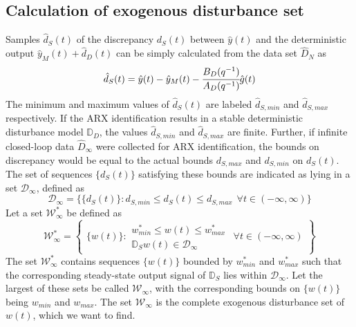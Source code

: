 \documentclass[letterpaper, 10 pt, conference]{ieeeconf}  %
\begin{document}
	\subsection{Calculation of exogenous disturbance set}
	\label{Noise}
	Samples $\hat{d}_S(t)$ of the discrepancy $d_S(t)$ between $\hat{y}(t)$ and the deterministic output $\hat{y}_M(t)+\hat{d}_D(t)$ can be simply calculated from the data set $\hat{D}_{N}$ as 
	\begin{equation*}
	\hat{d}_S(t) = \hat{y}(t)-\hat{y}_M(t)-\cfrac{B_D(q^{-1})}{A_D(q^{-1})} \hat{g}(t) 
	\end{equation*}
	The minimum and maximum values of $\hat{d}_S(t)$ are labeled $\hat{d}_{S,min}$ and $\hat{d}_{S,max}$ respectively. If the ARX identification results in a stable deterministic disturbance model $\mathbb{D}_D$, the values $\hat{d}_{S,min}$ and $\hat{d}_{S,max}$ are finite. Further, if infinite closed-loop data $\hat{D}_{\infty}$ were collected for ARX identification, the bounds on discrepancy would be equal to the actual bounds $d_{S,max}$ and $d_{S,min}$ on $d_S(t)$. The set of sequences $\{d_S(t)\}$ satisfying these bounds are indicated as lying in a set $\mathcal{D}_{\infty}$, defined as 
	\begin{equation*}
	\mathcal{D}_{\infty} = \{\{d_S(t)\}: d_{S,min} \leq d_S(t) \leq d_{S,max} \hspace{5pt} \forall t \in (-\infty,\infty) \}
	\end{equation*}
	 Let a set $\mathcal{W}^{*}_{\infty}$ be defined as
	\begin{equation*}
	\hspace{0pt}
	\mathcal{W}^*_{\infty} = \begin{Bmatrix} \{w(t)\}: 
	\begin{matrix}
	w^*_{min}\leq w(t)\leq w^*_{max} \\ 
	\mathbb{D}_S w(t) \in \mathcal{D}_{\infty}
	\end{matrix} \hspace{5pt}
	\forall t \in (-\infty,\infty) 
	\end{Bmatrix}
	\end{equation*}  
	The set $\mathcal{W}^*_{\infty}$ contains sequences $\{w(t)\}$  bounded by $w^*_{min}$ and $w^*_{max}$ such that the corresponding steady-state output signal of $\mathbb{D}_S$ lies within $\mathcal{D}_{\infty}$.  Let the largest of these sets be called $\mathcal{W}_{\infty}$, with the corresponding bounds on $\{w(t)\}$ being $w_{min}$ and $w_{max}$.
	The set $\mathcal{W}_{\infty}$ is the complete exogenous disturbance set of $w(t)$, which we want to find.
\end{document}
